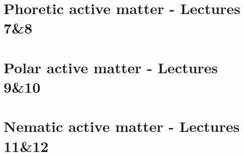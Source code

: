 \documentclass[10pt, a4paper, oneside]{book}
\begin{document}
    \chapter{Phoretic active matter - Lectures 7\&8}
    \label{chap_phoretic}

    \chapter{Polar active matter  - Lectures 9\&10}
    \label{chap_polar}

    \chapter{Nematic active matter  - Lectures 11\&12}
    \label{chap_nematic}

    \appendix




    
    

    
    
\end{document}
